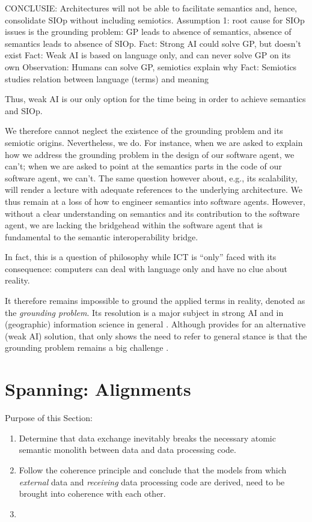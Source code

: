 \documentclass[a4paper,11pt,oneside,oldfontcommands]{memoir}
\theoremstyle{definition}
\theoremstyle{break}		%
\numberwithin{equation}{chapter}
\numberwithin{figure}{chapter}
\begin{document}
CONCLUSIE: Architectures will not be able to facilitate semantics and,
hence, consolidate SIOp without including semiotics. Assumption 1: root
cause for SIOp issues is the grounding problem: GP leads to absence of
semantics, absence of semantics leads to absence of SIOp. Fact: Strong
AI could solve GP, but doesn't exist Fact: Weak AI is based on language
only, and can never solve GP on its own Observation: Humans can solve
GP, semiotics explain why Fact: Semiotics studies relation between
language (terms) and meaning

Thus, weak AI is our only option for the time being in order to achieve
semantics and SIOp.

We therefore cannot neglect the existence of the grounding problem and
its semiotic origins. Nevertheless, we do. For instance, when we are
asked to explain how we address the grounding problem in the design of
our software agent, we can't; when we are asked to point at the
semantics parts in the code of our software agent, we can't. The same
question however about, e.g., its scalability, will render a lecture
with adequate references to the underlying architecture. We thus remain
at a loss of how to engineer semantics into software agents. However,
without a clear understanding on semantics and its contribution to the
software agent, we are lacking the bridgehead within the software agent
that is fundamental to the semantic interoperability bridge.

In fact, this is a question of philosophy while ICT is ``only'' faced
with its consequence: computers can deal with language only and have no
clue about reality.

It therefore remains impossible to ground the applied terms in reality,
denoted as the \emph{grounding problem}. Its resolution is a major
subject in strong AI and in (geographic) information science in general
\cite{Scheider:2012tj}. Although \cite{Steels:2008tr} provides for an
alternative (weak AI) solution, that only shows the need to refer to
general stance is that the grounding problem remains a big challenge .

\hypertarget{spanning-alignments}{%
\chapter{Spanning: Alignments}\label{spanning-alignments}}

Purpose of this Section:

\begin{enumerate}
\def\labelenumi{\arabic{enumi}.}
\item
  Determine that data exchange inevitably breaks the necessary atomic
  semantic monolith between data and data processing code.
\item
  Follow the coherence principle and conclude that the models from which
  \emph{external} data and \emph{receiving} data processing code are
  derived, need to be brought into coherence with each other.
\item
\end{enumerate}
\end{document}
